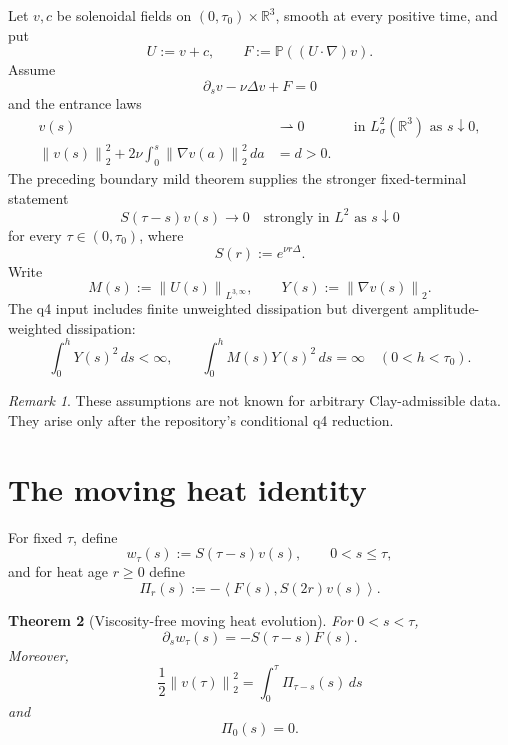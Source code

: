 \documentclass[11pt]{article}
\newtheorem{theorem}{Theorem}
\theoremstyle{remark}
\newtheorem{remark}[theorem]{Remark}
\newcommand{\R}{\mathbb R}
\newcommand{\Pp}{\mathbb P}
\newcommand{\norm}[1]{\left\|#1\right\|}
\newcommand{\ip}[2]{\left\langle #1,#2\right\rangle}
\newcommand{\weakto}{\rightharpoonup}
\begin{document}
Let \(v,c\) be solenoidal fields on
\((0,\tau_0)\times\R^3\), smooth at every positive time, and put
\[
 U:=v+c,\qquad F:=\Pp((U\cdot\nabla)v).
\]
Assume
\begin{equation}
\label{eq:evolution}
 \partial_s v-\nu\Delta v+F=0
\end{equation}
and the entrance laws
\begin{align}
\label{eq:weak}
 v(s)&\weakto0
 &&\text{in \(L^2_\sigma(\R^3)\) as \(s\downarrow0\)},\\
\label{eq:energy}
 \norm{v(s)}_2^2+
 2\nu\int_0^s\norm{\nabla v(a)}_2^2\,da&=d>0.
\end{align}
The preceding boundary mild theorem supplies the stronger fixed-terminal
statement
\begin{equation}
\label{eq:heat-boundary}
 S(\tau-s)v(s)\longrightarrow0
 \quad\text{strongly in \(L^2\) as \(s\downarrow0\)}
\end{equation}
for every \(\tau\in(0,\tau_0)\), where
\[
 S(r):=e^{\nu r\Delta}.
\]
Write
\begin{equation}
\label{eq:MY}
 M(s):=\norm{U(s)}_{L^{3,\infty}},
 \qquad
 Y(s):=\norm{\nabla v(s)}_2.
\end{equation}
The q4 input includes finite unweighted dissipation but divergent
amplitude-weighted dissipation:
\begin{equation}
\label{eq:weighted-divergence}
 \int_0^hY(s)^2\,ds<\infty,
 \qquad
 \int_0^hM(s)Y(s)^2\,ds=\infty
 \quad(0<h<\tau_0).
\end{equation}

\begin{remark}
These assumptions are not known for arbitrary Clay-admissible data.
They arise only after the repository's conditional q4 reduction.
\end{remark}

\section{The moving heat identity}

For fixed \(\tau\), define
\begin{equation}
\label{eq:moving-field}
 w_\tau(s):=S(\tau-s)v(s),
 \qquad 0<s\leq\tau,
\end{equation}
and for heat age \(r\geq0\) define
\begin{equation}
\label{eq:flux}
 \Pi_r(s):=-\ip{F(s)}{S(2r)v(s)}.
\end{equation}

\begin{theorem}[Viscosity-free moving heat evolution]
\label{thm:moving}
For \(0<s<\tau\),
\begin{equation}
\label{eq:moving-derivative}
 \partial_s w_\tau(s)=-S(\tau-s)F(s).
\end{equation}
Moreover,
\begin{equation}
\label{eq:diagonal}
 \boxed{
 \frac12\norm{v(\tau)}_2^2
 =
 \int_0^\tau\Pi_{\tau-s}(s)\,ds
 }
\end{equation}
and
\begin{equation}
\label{eq:zero-age}
 \Pi_0(s)=0.
\end{equation}
\end{theorem}
\end{document}
